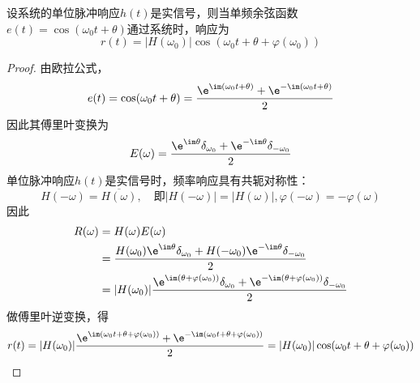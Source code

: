 \begin{lemma}\label{lemma:cos_filter}
    设系统的单位脉冲响应$h(t)$是实信号，则当单频余弦函数$e(t)=\cos(\omega_0 t+\theta)$通过系统时，响应为
    $$r(t)=|H(\omega_0)|\cos(\omega_0 t+\theta+\varphi(\omega_0))$$
\end{lemma}
\begin{proof}
    由欧拉公式，
    $$e(t)=\cos(\omega_0 t+\theta)=\frac{\e^{\im(\omega_0 t+\theta)}+\e^{-\im(\omega_0 t+\theta)}}{2}$$
    因此其傅里叶变换为
    $$E(\omega)=\frac{\e^{\im\theta}\delta_{\omega_0}+\e^{-\im\theta}\delta_{-\omega_0}}{2}$$
    单位脉冲响应$h(t)$是实信号时，频率响应具有共轭对称性：
    $$H(-\omega)=\overline{H(\omega)},\quad \text{即}|H(-\omega)|=\left|H(\omega)\right|,\varphi(-\omega)=-\varphi(\omega)$$
    因此
    \begin{align*}
        R(\omega)&=H(\omega)E(\omega)\\
        &=\frac{H(\omega_0)\e^{\im\theta}\delta_{\omega_0}+H(-\omega_0)\e^{-\im\theta}\delta_{-\omega_0}}{2}\\
        &=|H(\omega_0)|\frac{\e^{\im(\theta+\varphi(\omega_0))}\delta_{\omega_0}+\e^{-\im(\theta+\varphi(\omega_0))}\delta_{-\omega_0}}{2}
    \end{align*}
    做傅里叶逆变换，得
    $$r(t)=|H(\omega_0)|\frac{\e^{\im(\omega_0 t+\theta+\varphi(\omega_0))}+\e^{-\im(\omega_0 t+\theta+\varphi(\omega_0))}}{2}=|H(\omega_0)|\cos(\omega_0 t+\theta+\varphi(\omega_0))$$
\end{proof}

